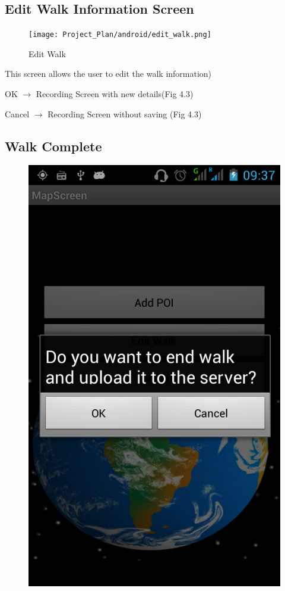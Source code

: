 \documentclass[12pt]{article}
\begin{document}
\subsection{Edit Walk Information Screen}
\begin{figure}[htp]
\centering
\texttt{[image: Project\_Plan/android/edit\_walk.png]}
\caption{Edit Walk}
\label{Edit Walk}
\end{figure}
\par{This screen allows the user to edit the walk information)
\par{OK $\rightarrow$ Recording Screen with new details(Fig 4.3)}
\par{Cancel $\rightarrow$ Recording Screen without saving (Fig 4.3)}
\clearpage
\subsection{Walk Complete}
\begin{figure}[htp]
\centering
\includegraphics[scale=0.40]{Project_Plan/android/upload_walk.png}

\end{figure}}
\end{document}
